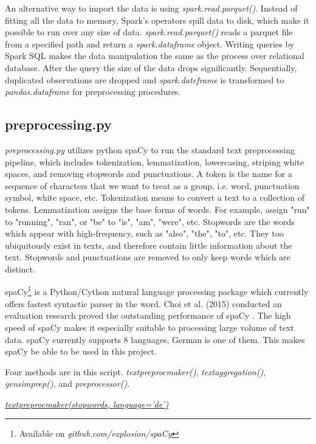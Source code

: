 \documentclass{article} %
\begin{document}
An alternative way to import the data is using \textit{spark.read.parquet()}. Instead of fitting all the data to memory, Spark's operators spill data to disk, which make it possible to run over any size of data. \textit{spark.read.parquet()} reads a parquet file from a specified path and return a \textit{spark.dataframe} object. Writing queries by Spark SQL makes the data manipulation the same as the process over relational database. After the query the size of the data drops significantly. Sequentially, duplicated observations are dropped and \textit{spark.dateframe} is transformed to \textit{pandas.dataframe} for preprocessing procedures.

\subsection{preprocessing.py}
\textit{preprocessing.py} utilizes python spaCy to run the standard text preprocessing pipeline, which includes tokenization, lemmatization, lowercasing, striping white spaces, and removing stopwords and punctuations. A token is the name for a sequence of characters that we want to treat as a group, i.e. word, punctuation symbol, white space, etc. Tokenization means to convert a text to a collection of tokens. Lemmatization assigns the base forms of words. For example, assign "run" to "running", "ran", or "be" to "is", "am", "were", etc. Stopwords are the words which appear with high-frequency, such as "also", "the", "to", etc. They too ubiquitously exist in texts, and therefore contain little information about the text. Stopwords and punctuations are removed to only keep words which are distinct.

spaCy\footnote{Available on \textit{github.com/explosion/spaCy}} is a Python/Cython natural language processing package which currently offers fastest syntactic parser in the word. Choi et al. (2015) conducted an evaluation research proved the outstanding performance of spaCy \cite{choi_it_2015}. The high speed of spaCy makes it especially suitable to processing large volume of text data. spaCy currently supports 8 languages, German is one of them. This makes spaCy be able to be used in this project.

Four methods are in this script. \textit{text\textunderscore{}preproc\textunderscore{}maker()}, \textit{text\textunderscore{}aggregation()}, \textit{gensim\textunderscore{}prep()}, and \textit{preprocessor()}.

\underline{\textit{text\textunderscore{}preproc\textunderscore{}maker(stopwords, language='de')}}
\end{document}
